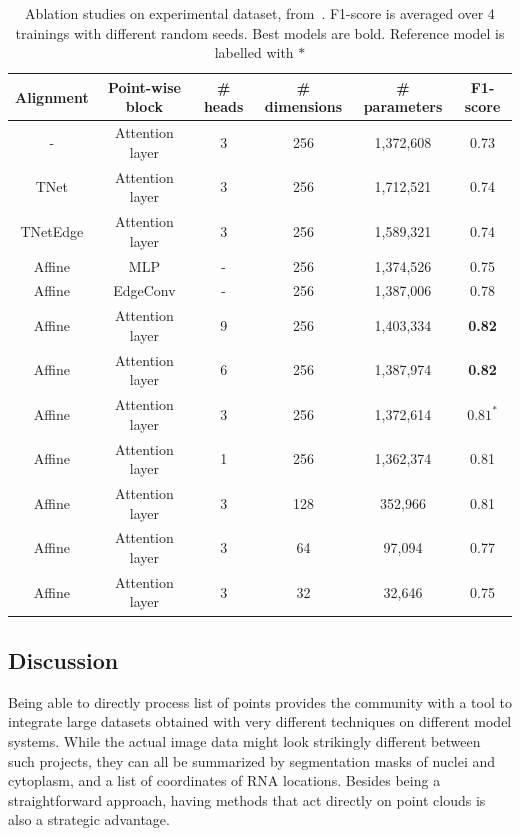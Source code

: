 \begin{table}[]
	\centering
	\begin{tabular}{| c | c | c | c | c | c |}
		\hline
		Alignment & Point-wise block & \# heads & \# dimensions & \# parameters & F1-score \\
		\hline\hline
		- & Attention layer & 3 & 256 & 1,372,608 & 0.73\\
		TNet & Attention layer & 3 & 256 & 1,712,521 & 0.74\\
		TNetEdge & Attention layer & 3 & 256 & 1,589,321 & 0.74\\
		\hline\hline
		Affine & MLP & - & 256 & 1,374,526 & 0.75\\
		Affine & EdgeConv & - & 256 & 1,387,006 & 0.78\\
		\hline\hline
		Affine & Attention layer & 9 & 256 & 1,403,334 & \textbf{0.82}\\
		Affine & Attention layer & 6 & 256 & 1,387,974 & \textbf{0.82}\\
		Affine & Attention layer & 3 & 256 & 1,372,614 & $0.81^{\ast}$\\
		Affine & Attention layer & 1 & 256 & 1,362,374 & 0.81\\
		\hline\hline
		Affine & Attention layer & 3 & 128 & 352,966 & 0.81\\
		Affine & Attention layer & 3 & 64 & 97,094 & 0.77\\
		Affine & Attention layer & 3 & 32 & 32,646 & 0.75\\
		\hline
	\end{tabular}
	\caption[Ablation studies (PointFISH)]{Ablation studies on experimental dataset, from~\cite{pointfish_2022}.
	F1-score is averaged over 4 trainings with different random seeds.
	Best models are bold.
	Reference model is labelled with $\ast$}
	\label{table:ablation}
\end{table}

\subsection{Discussion}
\label{subsec:discussion}

Being able to directly process list of points provides the community with a tool to integrate large datasets obtained with very different techniques on different model systems.
While the actual image data might look strikingly different between such projects, they can all be summarized by segmentation masks of nuclei and cytoplasm, and a list of coordinates of \ac{RNA} locations.
Besides being a straightforward approach, having methods that act directly on point clouds is also a strategic advantage.

